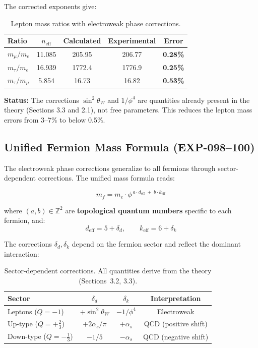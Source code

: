 \documentclass[12pt,a4paper]{article}
\begin{document}
The corrected exponents give:

\begin{table}[H]
\centering
\begin{tabular}{lcccc}
\toprule
\textbf{Ratio} & \textbf{$n_{\text{eff}}$} & \textbf{Calculated} & \textbf{Experimental} & \textbf{Error} \\
\midrule
$m_\mu/m_e$ & 11.085 & 205.95 & 206.77 & \textbf{0.28\%} \\
$m_\tau/m_e$ & 16.939 & 1772.4 & 1776.9 & \textbf{0.25\%} \\
$m_\tau/m_\mu$ & 5.854 & 16.73 & 16.82 & \textbf{0.53\%} \\
\bottomrule
\end{tabular}
\caption{Lepton mass ratios with electroweak phase corrections.}
\end{table}

\textbf{Status:} The corrections $\sin^2\theta_W$ and $1/\phi^4$ are quantities already present in the theory (Sections 3.3 and 2.1), not free parameters. This reduces the lepton mass errors from 3--7\% to below 0.5\%.

\subsection{Unified Fermion Mass Formula (EXP-098--100)}

The electroweak phase corrections generalize to all fermions through sector-dependent corrections. The unified mass formula reads:

\begin{equation}
\boxed{m_f = m_e \cdot \phi^{\,a \cdot d_{\text{eff}} \;+\; b \cdot k_{\text{eff}}}}
\end{equation}

where $(a,b) \in \mathbb{Z}^2$ are \textbf{topological quantum numbers} specific to each fermion, and:
\begin{equation}
d_{\text{eff}} = 5 + \delta_d, \qquad k_{\text{eff}} = 6 + \delta_k
\end{equation}

The corrections $\delta_d, \delta_k$ depend on the fermion sector and reflect the dominant interaction:

\begin{table}[H]
\centering
\begin{tabular}{lccc}
\toprule
\textbf{Sector} & $\delta_d$ & $\delta_k$ & \textbf{Interpretation} \\
\midrule
Leptons ($Q=-1$) & $+\sin^2\theta_W$ & $-1/\phi^4$ & Electroweak \\
Up-type ($Q=+\tfrac{2}{3}$) & $+2\alpha_s/\pi$ & $+\alpha_s$ & QCD (positive shift) \\
Down-type ($Q=-\tfrac{1}{3}$) & $-1/5$ & $-\alpha_s$ & QCD (negative shift) \\
\bottomrule
\end{tabular}
\caption{Sector-dependent corrections. All quantities derive from the theory (Sections~3.2, 3.3).}
\end{table}
\end{document}

